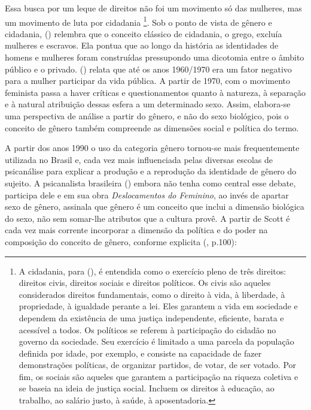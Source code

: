 Essa busca por um leque de direitos não foi um movimento só das mulheres, mas um movimento de luta por cidadania
\footnote{A cidadania, para  (\citeyear{CARVALHO2002}), é entendida como o exercício pleno de três direitos: direitos civis, direitos sociais e direitos políticos. Os civis são aqueles considerados direitos fundamentais, como o direito à vida, à liberdade, à propriedade, à igualdade perante a lei. Eles garantem a vida em sociedade e dependem da existência de uma justiça independente, eficiente, barata e acessível a todos. Os políticos se referem à participação do cidadão no governo da sociedade. Seu exercício é limitado a uma parcela da população definida por idade, por exemplo, e consiste na capacidade de fazer demonstrações políticas, de organizar partidos, de votar, de ser votado. Por fim, os sociais são aqueles que garantem a participação na riqueza coletiva e se baseia na ideia de justiça social. Incluem os direitos à educação, ao trabalho, ao salário justo, à saúde, à aposentadoria.}. Sob o ponto de vista de gênero e cidadania,  (\citeyear{BRITO2001}) relembra que o conceito clássico de cidadania, o grego, excluía mulheres e escravos. Ela pontua que ao longo da história as identidades de homens e mulheres foram construídas pressupondo uma dicotomia entre o âmbito público e o privado.  (\citeyear{BLAY2001}) relata que até os anos 1960/1970 era um fator negativo para a mulher participar da vida pública.
A partir de 1970, com o movimento feminista passa a haver críticas e questionamentos quanto à natureza, à separação e à natural atribuição dessas esfera a um determinado sexo. Assim, elabora-se uma perspectiva de análise a partir do gênero, e não do sexo biológico, pois o conceito de gênero também compreende as dimensões social e política do termo.

A partir dos anos 1990 o uso da categoria gênero tornou-se mais frequentemente utilizada no Brasil e, cada vez mais influenciada pelas diversas escolas de psicanálise para explicar a produção e a reprodução da identidade de gênero do sujeito.
A psicanalista brasileira  (\citeyear{KEHL1998}) embora não tenha como central esse debate, participa dele e em sua obra \emph{Deslocamentos do Feminino}, ao invés de apartar sexo de gênero, assinala que gênero é um conceito que inclui a dimensão biológica do sexo, não sem somar-lhe atributos que a cultura provê.
A partir de Scott é cada vez mais corrente incorporar a dimensão da política e do poder na composição do conceito de gênero, conforme explicita  (\citeyear{MORAES1998}, p.100):

